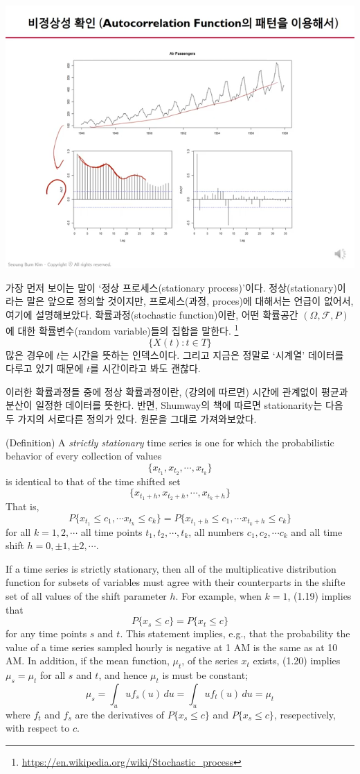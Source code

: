 \documentclass{article}
\begin{document}
\begin{center}
\includegraphics[width=.45\textwidth]{1stationarity_5}
\end{center}
가장 먼저 보이는 말이 `정상 프로세스(stationary process)'이다.
정상(stationary)이라는 말은 앞으로 정의할 것이지만, 프로세스(과정, proces)에 대해서는 언급이 없어서, 여기에 설명해보았다.
확률과정(stochastic function)이란, 어떤 확률공간 \((\Omega, \mathcal F, P)\)에 대한 확률변수(random variable)들의 집합을 말한다.
\footnote{\url{https://en.wikipedia.org/wiki/Stochastic_process}}
\[\{X(t):t\in T\}\]
많은 경우에 \(t\)는 시간을 뜻하는 인덱스이다.
그리고 지금은 정말로 `시계열' 데이터를 다루고 있기 때문에 \(t\)를 시간이라고 봐도 괜찮다.

이러한 확률과정들 중에 정상 확률과정이란, (강의에 따르면) 시간에 관계없이 평균과 분산이 일정한 데이터를 뜻한다.
반면, Shumway의 책에 따르면 stationarity는 다음 두 가지의 서로다른 정의가 있다.
원문을 그대로 가져와보았다.

(Definition)
A \emph{strictly stationary} time series is one for which the probabilistic behavior of every collection of values
\[\{x_{t_1},x_{t_2},\cdots,x_{t_k}\}\]
is identical to that of the time shifted set
\[\{x_{t_1+h},x_{t_2+h},\cdots,x_{t_k+h}\}\]
That is, 
\[P\{x_{t_1}\le c_1,\cdots x_{t_k}\le c_k\}=P\{x_{t_1+h}\le c_1,\cdots x_{t_k+h}\le c_k\}\tag{1.19}\]
for all \(k=1,2,\cdots\) all time points \(t_1,t_2,\cdots,t_k\), all numbers \(c_1,c_2,\cdots c_k\) and all time shift \(h=0,\pm1,\pm2,\cdots\).

If a time series is strictly stationary, then all of the multiplicative distribution function for subsets of variables must agree with their counterparts in the shifte set of all values of the shift parameter \(h\).
For example, when \(k=1\), (1.19) implies that
\[P\{x_s\le c\}=P\{x_t\le c\}\tag{1.20}\]
for any time points \(s\) and \(t\).
This statement implies, e.g., that the probability the value of a time series sampled hourly is negative at 1 AM is the same as at 10 AM.
In addition, if the mean function, \(\mu_t\), of the series \(x_t\) exists, (1.20) implies \(\mu_s=\mu_t\) for all \(s\) and \(t\), and hence \(\mu_t\) is must be constant;
\[\mu_s=\int_u uf_s(u)\,du=\int_u uf_t(u)\,du=\mu_t\]
where \(f_t\) and \(f_s\) are the derivatives of \(P\{x_s\le c\}\) and \(P\{x_s\le c\}\), resepectively, with respect to \(c\).
\end{document}
